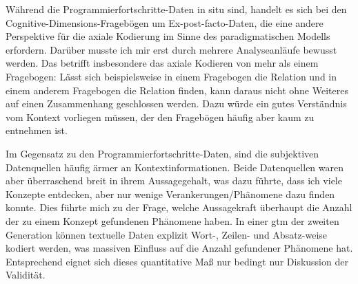 Während die Programmierfortschritte-Daten in situ sind, handelt es sich bei den Cognitive-Dimensions-Fragebögen um Ex-post-facto-Daten, die eine andere Perspektive für die axiale Kodierung im Sinne des paradigmatischen Modells erfordern. Darüber musste ich mir erst durch mehrere Analyseanläufe bewusst werden. Das betrifft insbesondere das axiale Kodieren von mehr als einem Fragebogen: Lässt sich beispielsweise in einem Fragebogen die Relation  und in einem anderem Fragebogen die Relation  finden, kann daraus nicht ohne Weiteres auf einen Zusammenhang  geschlossen werden. Dazu würde ein gutes Verständnis vom Kontext vorliegen müssen, der den Fragebögen häufig aber kaum zu entnehmen ist.

Im Gegensatz zu den Programmierfortschritte-Daten, sind die subjektiven Datenquellen häufig ärmer an Kontextinformationen. Beide Datenquellen waren aber überraschend breit in ihrem Aussagegehalt, was dazu führte, dass ich viele Konzepte entdecken, aber nur wenige Verankerungen/Phänomene dazu finden konnte.
Dies führte mich zu der Frage, welche Aussagekraft überhaupt die Anzahl der zu einem Konzept gefundenen Phänomene haben. In einer \gls{gtm} der zweiten Generation \citep{charmaz2006constructing} können textuelle Daten explizit Wort-, Zeilen- und Absatz-weise kodiert werden, was massiven Einfluss auf die Anzahl gefundener Phänomene hat. Entsprechend eignet sich dieses quantitative Maß nur bedingt nur Diskussion der Validität.




